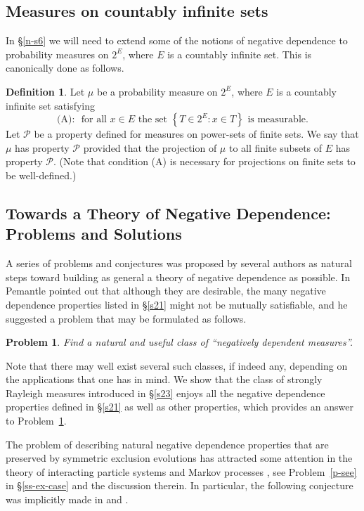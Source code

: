 \documentclass[10pt,reqno]{amsart}
\theoremstyle{plain}
\newtheorem{problem}{Problem}[section]
\theoremstyle{definition}
\newtheorem{definition}{Definition}[section]
\theoremstyle{remark}
\begin{document}
\subsection{Measures on countably infinite sets}\label{s240}
In \S \ref{n-s6} we will need to extend some of the notions of  
negative dependence to probability 
measures on $2^{E}$, where $E$ is a countably infinite set. This is 
canonically done as follows. 

\begin{definition}\label{infinite}
Let $\mu$ be a probability measure on $2^E$, where $E$ is a countably 
infinite set satisfying 
$$
\mbox{ (A): \ \ }\mbox{ for all } x \in E \mbox{ the set } 
\left\{T \in 2^E : x \in T\right\} \mbox{ is measurable. } 
$$
 Let $\mathcal{P}$ be a property defined for measures on power-sets of finite 
sets. We say that $\mu$ has property $\mathcal{P}$ provided that the 
projection of $\mu$ to all finite subsets of $E$ has property $\mathcal{P}$. 
(Note that 
condition (A) is necessary for projections on finite sets to be well-defined.) 
\end{definition}

\subsection{Towards a Theory of Negative Dependence: Problems and 
Solutions}\label{s24}

A series of problems and conjectures was proposed by several authors as 
natural steps toward building as general a theory of negative dependence as 
possible. In \cite[\S III]{P} Pemantle pointed out that although
they are desirable, the many negative dependence properties listed in 
\S \ref{s21} might not be mutually satisfiable, and he suggested a problem that
may be formulated as follows.

\begin{problem}\label{pem-prob}
Find a natural and useful class of ``negatively dependent measures''.
\end{problem}

Note that there may well exist several such classes, if indeed any, 
depending on the
applications that one has in mind. We show that the class of strongly Rayleigh 
measures introduced in \S \ref{s23} enjoys all the negative dependence 
properties defined in \S \ref{s21} as well as other properties, which 
provides an answer to Problem~\ref{pem-prob}. 

The problem of describing natural
negative dependence properties that are preserved by symmetric exclusion 
evolutions has 
attracted some attention in the theory of 
interacting particle systems
and Markov processes \cite{L0,L00,L2}, see Problem~\ref{p-see} in 
\S \ref{ss-ex-case} and the discussion therein. In particular, the 
following conjecture
was implicitly made in \cite[p.~1374]{P} and \cite[p.~551]{L2}. 
\end{document}
